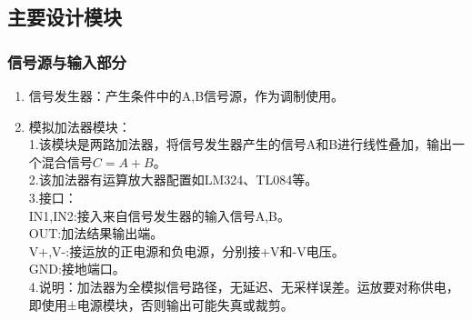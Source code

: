 \documentclass{article}
\begin{document}
\subsection{主要设计模块}
\begin{enumerate}
\subsubsection{信号源与输入部分}
\begin{enumerate}
\item 信号发生器：产生条件中的A,B信号源，作为调制使用。
\item 模拟加法器模块：
\\1.该模块是两路加法器，将信号发生器产生的信号A和B进行线性叠加，输出一个混合信号$C = A + B$。
\\2.该加法器有运算放大器配置如LM324、TL084等。
\\3.接口：
\\IN1,IN2:接入来自信号发生器的输入信号A,B。
\\OUT:加法结果输出端。
\\V+,V-:接运放的正电源和负电源，分别接+V和-V电压。
\\GND:接地端口。
\\4.说明：加法器为全模拟信号路径，无延迟、无采样误差。运放要对称供电，即使用±电源模块，否则输出可能失真或裁剪。
\end{enumerate}    


\end{enumerate}
\end{document}
